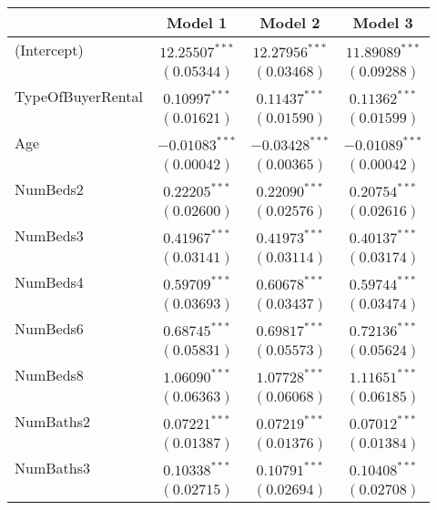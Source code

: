 
\begin{table}
\begin{center}
\begin{tabular}{l c c c}
\hline
 & Model 1 & Model 2 & Model 3 \\
\hline
(Intercept)           & $12.25507^{***}$ & $12.27956^{***}$ & $11.89089^{***}$ \\
                      & $(0.05344)$      & $(0.03468)$      & $(0.09288)$      \\
TypeOfBuyerRental     & $0.10997^{***}$  & $0.11437^{***}$  & $0.11362^{***}$  \\
                      & $(0.01621)$      & $(0.01590)$      & $(0.01599)$      \\
Age                   & $-0.01083^{***}$ & $-0.03428^{***}$ & $-0.01089^{***}$ \\
                      & $(0.00042)$      & $(0.00365)$      & $(0.00042)$      \\
NumBeds2              & $0.22205^{***}$  & $0.22090^{***}$  & $0.20754^{***}$  \\
                      & $(0.02600)$      & $(0.02576)$      & $(0.02616)$      \\
NumBeds3              & $0.41967^{***}$  & $0.41973^{***}$  & $0.40137^{***}$  \\
                      & $(0.03141)$      & $(0.03114)$      & $(0.03174)$      \\
NumBeds4              & $0.59709^{***}$  & $0.60678^{***}$  & $0.59744^{***}$  \\
                      & $(0.03693)$      & $(0.03437)$      & $(0.03474)$      \\
NumBeds6              & $0.68745^{***}$  & $0.69817^{***}$  & $0.72136^{***}$  \\
                      & $(0.05831)$      & $(0.05573)$      & $(0.05624)$      \\
NumBeds8              & $1.06090^{***}$  & $1.07728^{***}$  & $1.11651^{***}$  \\
                      & $(0.06363)$      & $(0.06068)$      & $(0.06185)$      \\
NumBaths2             & $0.07221^{***}$  & $0.07219^{***}$  & $0.07012^{***}$  \\
                      & $(0.01387)$      & $(0.01376)$      & $(0.01384)$      \\
NumBaths3             & $0.10338^{***}$  & $0.10791^{***}$  & $0.10408^{***}$  \\
                      & $(0.02715)$      & $(0.02694)$      & $(0.02708)$      \\

\end{tabular}
\end{center}
\end{table}
